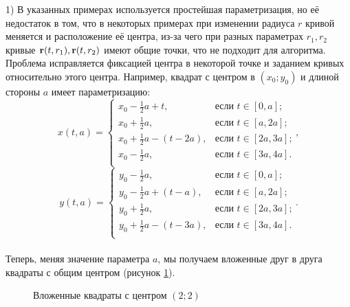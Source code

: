 \documentclass[a4paper]{article}
\begin{document}
  1) В указанных примерах используется простейшая параметризация, но её недостаток в том, что в некоторых примерах при изменении радиуса $r$ кривой меняется и расположение её центра, из-за чего при разных параметрах $r_1,r_2$ кривые ${\bf r}(t,r_1),{\bf r}(t,r_2)$ имеют общие точки, что не подходит для алгоритма.
        Проблема исправляется фиксацией центра в некоторой точке и заданием кривых относительно этого центра. Например, квадрат с центром в $(x_0;y_0)$ и длиной стороны $a$ имеет параметризацию:
        \[
          x(t,a) =
          \begin{cases}
            x_0-\frac{1}{2}a+t,      & \text{если $t \in [0,a]$;}   \\
            x_0+\frac{1}{2}a,        & \text{если $t \in [a,2a]$;}  \\
            x_0+\frac{1}{2}a-(t-2a), & \text{если $t \in [2a,3a]$;} \\
            x_0-\frac{1}{2}a,        & \text{если $t \in [3a,4a]$.} \\
          \end{cases},
        \]
        \[
          y(t,a) =
          \begin{cases}
            y_0-\frac{1}{2}a,        & \text{если $t \in [0,a]$;}   \\
            y_0-\frac{1}{2}a+(t-a),  & \text{если $t \in [a,2a]$;}  \\
            y_0+\frac{1}{2}a,        & \text{если $t \in [2a,3a]$;} \\
            y_0+\frac{1}{2}a-(t-3a), & \text{если $t \in [3a,4a]$.} \\
          \end{cases}.
        \]
        \\
        Теперь, меняя значение параметра $a$, мы получаем вложенные друг в друга квадраты с общим центром (рисунок \ref{rects}).
        \begin{figure}[h!]
          \noindent{}
          \caption{Вложенные квадраты с центром $(2;2)$}
          \label{rects}
        \end{figure}
\end{document}
